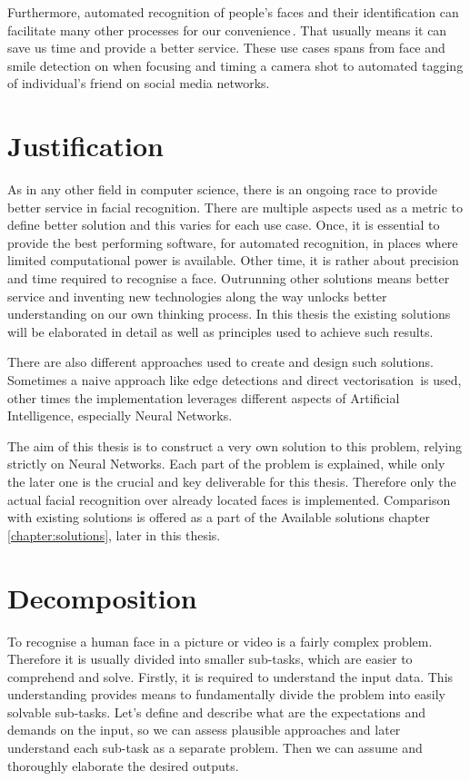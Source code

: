 Furthermore, automated recognition of people's faces and their identification can facilitate many other processes for our convenience\,\cite{ourbiometricfuture}. That usually means it can save us time and provide a better service. These use cases spans from face and smile detection on when focusing and timing a camera shot to automated tagging of individual's friend on social media networks.

\section{Justification}

As in any other field in computer science, there is an ongoing race to provide better service in facial recognition. There are multiple aspects used as a metric to define better solution and this varies for each use case. Once, it is essential to provide the best performing software, for automated recognition, in places where limited computational power is available. Other time, it is rather about precision and time required to recognise a face. Outrunning other solutions means better service and inventing new technologies along the way unlocks better understanding on our own thinking process. In this thesis the existing solutions will be elaborated in detail as well as principles used to achieve such results.

There are also different approaches used to create and design such solutions. Sometimes a naive approach like edge detections and direct vectorisation\,\cite{prabhu2009facial} is used, other times the implementation leverages different aspects of Artificial Intelligence, especially Neural Networks.

The aim of this thesis is to construct a very own solution to this problem, relying strictly on Neural Networks. Each part of the problem is explained, while only the later one is the crucial and key deliverable for this thesis. Therefore only the actual facial recognition over already located faces is implemented. Comparison with existing solutions is offered as a part of the Available solutions chapter\,\ref{chapter:solutions}, later in this thesis.

\section{Decomposition}

To recognise a human face in a picture or video is a fairly complex problem. Therefore it is usually divided into smaller sub-tasks, which are easier to comprehend and solve. Firstly, it is required to understand the input data. This understanding provides means to fundamentally divide the problem into easily solvable sub-tasks. Let's define and describe what are the expectations and demands on the input, so we can assess plausible approaches and later understand each sub-task as a separate problem. Then we can assume and thoroughly elaborate the desired outputs.

